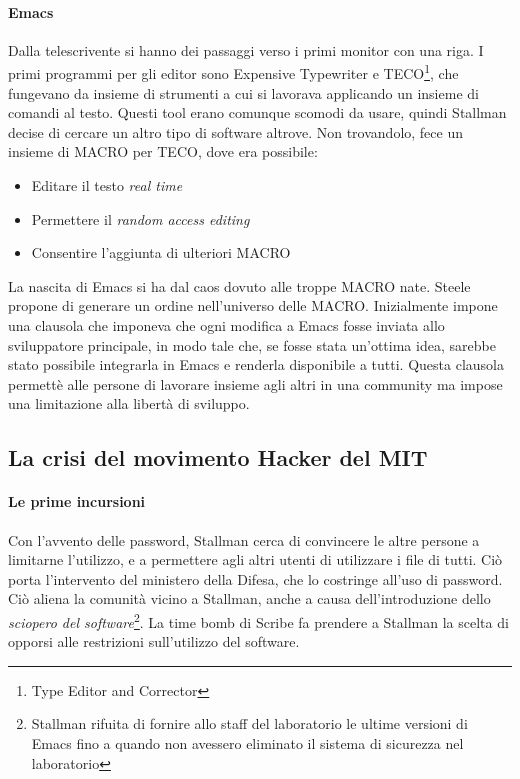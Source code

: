 \paragraph*{Emacs} Dalla telescrivente si hanno dei passaggi verso i primi monitor con una riga. I primi programmi per gli editor sono Expensive Typewriter e TECO\footnote{Type Editor and Corrector}, che fungevano da insieme di strumenti a cui si lavorava applicando un insieme di comandi al testo. Questi tool erano comunque scomodi da usare, quindi Stallman decise di cercare un altro tipo di software altrove. Non trovandolo, fece un insieme di MACRO per TECO, dove era possibile:
\begin{itemize}
  
\item Editare il testo \textit{real time}
\item Permettere il \textit{random access editing}
\item Consentire l'aggiunta di ulteriori MACRO

\end{itemize}

La nascita di Emacs si ha dal caos dovuto alle troppe MACRO nate. Steele propone di generare un ordine nell'universo delle MACRO. Inizialmente impone una clausola che imponeva che ogni modifica a Emacs fosse inviata allo sviluppatore principale, in modo tale che, se fosse stata un'ottima idea, sarebbe stato possibile integrarla in Emacs e renderla disponibile a tutti. Questa clausola permett\`e alle persone di lavorare insieme agli altri in una community ma impose una limitazione alla libert\`a di sviluppo.

\subsection{La crisi del movimento Hacker del MIT}

\paragraph*{Le prime incursioni} Con l'avvento delle password, Stallman cerca di convincere le altre persone a limitarne l'utilizzo, e a permettere agli altri utenti di utilizzare i file di tutti. Ci\`o porta l'intervento del ministero della Difesa, che lo costringe all'uso di password. Ci\`o aliena la comunit\`a vicino a Stallman, anche a causa dell'introduzione dello \textit{sciopero del software}\footnote{Stallman rifuita di fornire allo staff del laboratorio le ultime versioni di Emacs fino a quando non avessero eliminato il sistema di sicurezza nel laboratorio}. La time bomb di Scribe fa prendere a Stallman la scelta di opporsi alle restrizioni sull'utilizzo del software.

